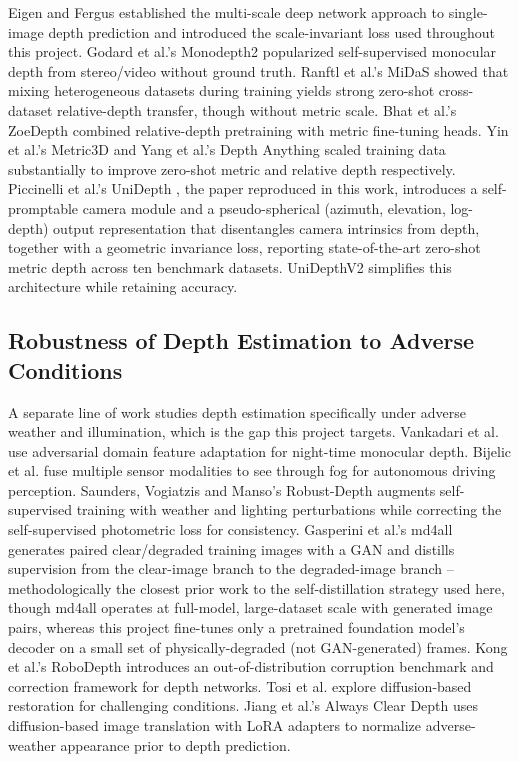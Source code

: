\documentclass[conference]{IEEEtran}
\begin{document}
Eigen and Fergus \cite{ref2} established the multi-scale deep network approach to single-image depth prediction and introduced the scale-invariant loss used throughout this project. Godard et al.'s Monodepth2 \cite{ref6} popularized self-supervised monocular depth from stereo/video without ground truth. Ranftl et al.'s MiDaS \cite{ref7} showed that mixing heterogeneous datasets during training yields strong zero-shot cross-dataset relative-depth transfer, though without metric scale. Bhat et al.'s ZoeDepth \cite{ref3} combined relative-depth pretraining with metric fine-tuning heads. Yin et al.'s Metric3D \cite{ref4} and Yang et al.'s Depth Anything \cite{ref5} scaled training data substantially to improve zero-shot metric and relative depth respectively. Piccinelli et al.'s UniDepth \cite{ref1}, the paper reproduced in this work, introduces a self-promptable camera module and a pseudo-spherical (azimuth, elevation, log-depth) output representation that disentangles camera intrinsics from depth, together with a geometric invariance loss, reporting state-of-the-art zero-shot metric depth across ten benchmark datasets. UniDepthV2 \cite{ref8} simplifies this architecture while retaining accuracy.

\subsection{Robustness of Depth Estimation to Adverse Conditions}

A separate line of work studies depth estimation specifically under adverse weather and illumination, which is the gap this project targets. Vankadari et al. \cite{ref9} use adversarial domain feature adaptation for night-time monocular depth. Bijelic et al. \cite{ref10} fuse multiple sensor modalities to see through fog for autonomous driving perception. Saunders, Vogiatzis and Manso's Robust-Depth \cite{ref11} augments self-supervised training with weather and lighting perturbations while correcting the self-supervised photometric loss for consistency. Gasperini et al.'s md4all \cite{ref12} generates paired clear/degraded training images with a GAN and distills supervision from the clear-image branch to the degraded-image branch -- methodologically the closest prior work to the self-distillation strategy used here, though md4all operates at full-model, large-dataset scale with generated image pairs, whereas this project fine-tunes only a pretrained foundation model's decoder on a small set of physically-degraded (not GAN-generated) frames. Kong et al.'s RoboDepth \cite{ref13} introduces an out-of-distribution corruption benchmark and correction framework for depth networks. Tosi et al. \cite{ref14} explore diffusion-based restoration for challenging conditions. Jiang et al.'s Always Clear Depth \cite{ref15} uses diffusion-based image translation with LoRA adapters to normalize adverse-weather appearance prior to depth prediction.
\end{document}
